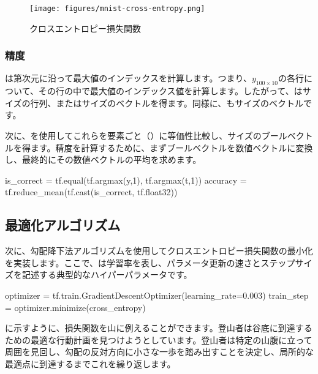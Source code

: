 \begin{content}
\begin{content}
\begin{figure}[H]
\centering
\texttt{[image: figures/mnist-cross-entropy.png]}
\caption{クロスエントロピー損失関数}
 \label{fig:mnist-cross-entropy}
\end{figure}

\subsubsection{精度}

は第次元に沿って最大値のインデックスを計算します。つまり、$ y_{100 \times 10} $の各行について、その行の中で最大値のインデックス値を計算します。したがって、はサイズ\code{[100, 1]}の行列、またはサイズのベクトルを得ます。同様に、もサイズのベクトルです。

次に、を使用してこれらを要素ごと（）に等価性比較し、サイズのブールベクトルを得ます。精度を計算するために、まずブールベクトルを数値ベクトルに変換し、最終的にその数値ベクトルの平均を求めます。

\begin{leftbar}
\begin{python}
is_correct = tf.equal(tf.argmax(y,1), tf.argmax(t,1))
accuracy = tf.reduce_mean(tf.cast(is_correct, tf.float32))
\end{python}
\end{leftbar}

\subsection{最適化アルゴリズム}

次に、勾配降下法アルゴリズムを使用してクロスエントロピー損失関数の最小化を実装します。ここで、は学習率を表し、パラメータ更新の速さとステップサイズを記述する典型的なハイパーパラメータです。

\begin{leftbar}
\begin{python}
optimizer = tf.train.GradientDescentOptimizer(learning_rate=0.003)
train_step = optimizer.minimize(cross_entropy)
\end{python}
\end{leftbar}

に示すように、損失関数を山に例えることができます。登山者は谷底に到達するための最適な行動計画を見つけようとしています。登山者は特定の山腹に立って周囲を見回し、勾配の反対方向に小さな一歩を踏み出すことを決定し、局所的な最適点に到達するまでこれを繰り返します。


\end{content}
\end{content}
